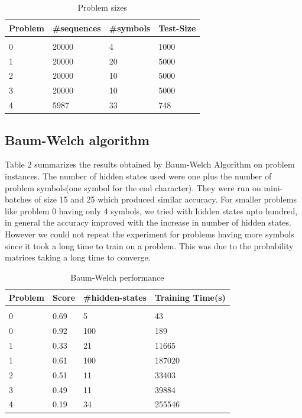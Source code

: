 \documentclass[letterpaper]{article}
\begin{document}
\begin{table}[h]
\caption{Problem sizes}
\label{sample-table}
\begin{center}
\begin{tabular}{llll}
\multicolumn{1}{c}{\bf Problem}  &\multicolumn{1}{c}{\bf \#sequences} &\multicolumn{1}{c}{\bf \#symbols} &\multicolumn{1}{c}{\bf Test-Size}\\
\hline \\
0	&20000	&4 	&1000\\
1	&20000	&20	&5000\\
2	&20000	&10	&5000\\
3	&20000	&10	&5000\\
4	&5987	&33	&748\\
\end{tabular}
\end{center}
\end{table}

\subsection{Baum-Welch algorithm}
Table 2 summarizes the results obtained by Baum-Welch Algorithm on problem instances. The number of hidden states used were one plus the number of problem symbols(one symbol for the end character). They were run on mini-batches of size 15 and 25 which produced similar accuracy. For smaller problems like problem 0 having only 4 symbols, we tried with hidden states upto hundred, in general the accuracy improved with the increase in number of hidden states. However we could not repeat the experiment for problems having more symbols since it took a long time to train on a problem. This was due to the probability matrices taking a long time to converge. 

\begin{table}[h]
\caption{Baum-Welch performance}
\label{sample-table}
\begin{center}
\begin{tabular}{llll}
\multicolumn{1}{c}{\bf Problem}  &\multicolumn{1}{c}{\bf Score} &\multicolumn{1}{c}{\bf \#hidden-states} &\multicolumn{1}{c}{\bf Training Time(s)}\\
\hline \\
0	&0.69	&5 		&43\\
0	&0.92	&100 	&189\\
1	&0.33	&21		&11665\\
1	&0.61	&100	&187020\\
2	&0.51	&11		&33403\\
3	&0.49	&11		&39884\\
4	&0.19	&34		&255546\\
\end{tabular}
\end{center}
\end{table}
\end{document}
